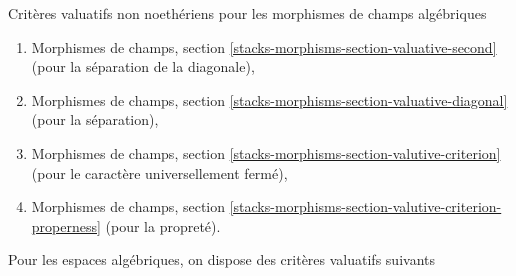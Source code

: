 \medskip\noindent
Critères valuatifs non noethériens pour les morphismes de champs algébriques
\begin{enumerate}
\item Morphismes de champs, section
\ref{stacks-morphisms-section-valuative-second}
(pour la séparation de la diagonale),
\item Morphismes de champs, section
\ref{stacks-morphisms-section-valuative-diagonal}
(pour la séparation),
\item Morphismes de champs, section
\ref{stacks-morphisms-section-valutive-criterion}
(pour le caractère universellement fermé),
\item Morphismes de champs, section
\ref{stacks-morphisms-section-valutive-criterion-properness}
(pour la propreté).
\end{enumerate}
Pour les espaces algébriques, on dispose des critères valuatifs suivants
